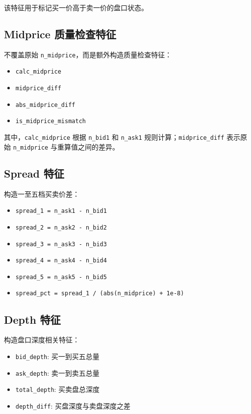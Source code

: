 \documentclass[UTF8,a4paper,12pt]{ctexart}
\begin{document}
该特征用于标记买一价高于卖一价的盘口状态。

\subsection{Midprice 质量检查特征}

不覆盖原始 \texttt{n\_midprice}，而是额外构造质量检查特征：

\begin{itemize}
  \item \texttt{calc\_midprice}
  \item \texttt{midprice\_diff}
  \item \texttt{abs\_midprice\_diff}
  \item \texttt{is\_midprice\_mismatch}
\end{itemize}

其中，\texttt{calc\_midprice} 根据 \texttt{n\_bid1} 和 \texttt{n\_ask1} 规则计算；\texttt{midprice\_diff} 表示原始 \texttt{n\_midprice} 与重算值之间的差异。

\subsection{Spread 特征}

构造一至五档买卖价差：

\begin{itemize}
  \item \texttt{spread\_1 = n\_ask1 - n\_bid1}
  \item \texttt{spread\_2 = n\_ask2 - n\_bid2}
  \item \texttt{spread\_3 = n\_ask3 - n\_bid3}
  \item \texttt{spread\_4 = n\_ask4 - n\_bid4}
  \item \texttt{spread\_5 = n\_ask5 - n\_bid5}
  \item \texttt{spread\_pct = spread\_1 / (abs(n\_midprice) + 1e-8)}
\end{itemize}

\subsection{Depth 特征}

构造盘口深度相关特征：

\begin{itemize}
  \item \texttt{bid\_depth}: 买一到买五总量
  \item \texttt{ask\_depth}: 卖一到卖五总量
  \item \texttt{total\_depth}: 买卖盘总深度
  \item \texttt{depth\_diff}: 买盘深度与卖盘深度之差
\end{itemize}
\end{document}
